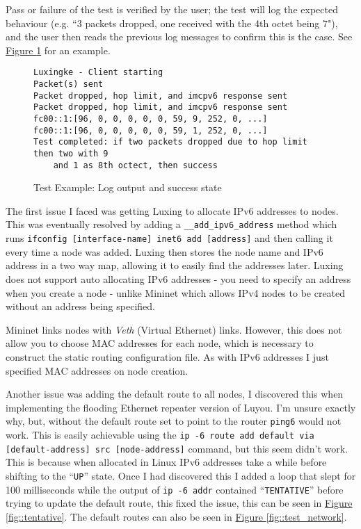 \documentclass[12pt,a4paper,twoside,openany]{report}
\begin{document}
Pass or failure of the test is verified by the user; the test will log the expected behaviour (e.g. ``3 packets dropped, one received with the 4th octet being 7"), and the user then reads the previous log messages to confirm this is the case. See \hyperref[fig::test_success]{Figure }\ref{fig::test_success} for an example.

\begin{figure}
\begin{verbatim}
Luxingke - Client starting
Packet(s) sent
Packet dropped, hop limit, and imcpv6 response sent
Packet dropped, hop limit, and imcpv6 response sent
fc00::1:[96, 0, 0, 0, 0, 0, 59, 9, 252, 0, ...]
fc00::1:[96, 0, 0, 0, 0, 0, 59, 1, 252, 0, ...]
Test completed: if two packets dropped due to hop limit then two with 9 
    and 1 as 8th octect, then success
\end{verbatim}
\caption{Test Example: Log output and success state}
\label{fig::test_success}
\end{figure}

\bigskip

The first issue I faced was getting Luxing to allocate IPv6 addresses to nodes. This was eventually resolved by adding a \verb!__add_ipv6_address! method which runs \verb!ifconfig [interface-name] inet6 add [address]! and then calling it every time a node was added. Luxing then stores the node name and IPv6 address in a two way map, allowing it to easily find the addresses later. Luxing does not support auto allocating IPv6 addresses - you need to specify an address when you create a node - unlike Mininet which allows IPv4 nodes to be created without an address being specified.

\bigskip

Mininet links nodes with \textit{Veth} (Virtual Ethernet) links. However, this does not allow you to choose MAC addresses for each node, which is necessary to construct the static routing configuration file. As with IPv6 addresses I just specified MAC addresses on node creation.

\bigskip

Another issue was adding the default route to all nodes, I discovered this when implementing the flooding Ethernet repeater version of Luyou.  I'm unsure exactly why, but, without the default route set to point to the router \verb!ping6! would not work. This is easily achievable using the \verb!ip -6 route add default via [default-address] src [node-address]! command, but this seem didn't work.  This is because when allocated in Linux IPv6 addresses take a while before shifting to the ``\verb!UP!'' state.  Once I had discovered this I added a loop that slept for 100 milliseconds while the output of \verb!ip -6 addr! contained ``\verb!TENTATIVE!'' before trying to update the default route, this fixed the issue, this can be seen in \hyperref[fig::tentative]{Figure }\ref{fig::tentative}.  The default routes can also be seen in \hyperref[fig::test_network]{Figure }\ref{fig::test_network}.
\end{document}
